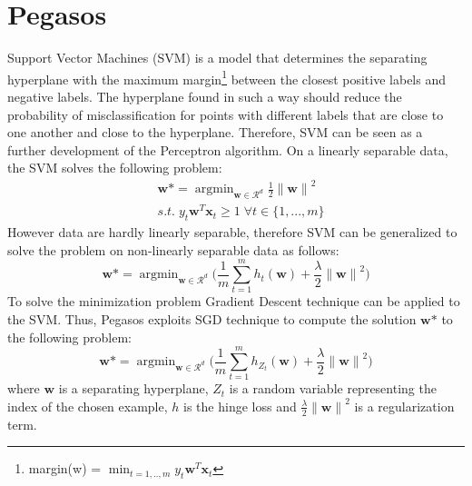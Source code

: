\documentclass{article}
\DeclareMathOperator*{\argmin}{argmin}
\begin{document}
\section{Pegasos} \label{Pegaos}
 Support Vector Machines (SVM) is a model that determines the separating hyperplane with the maximum margin\footnote{margin(w) = $\min_{t=1,..,m} y_t\textbf{w}^T\textbf{x}_t$} between the closest positive labels and negative labels. The hyperplane found in such a way should reduce the probability of misclassification for points with different labels that are close to one another and close to the hyperplane. Therefore, SVM can be seen as a further development of the Perceptron algorithm.
 On a linearly separable data, the SVM solves the following problem:
\begin{equation}
\begin{split}
   &   \textbf{w} \mbox{*} = \argmin_{\textbf{w} \in \mathcal{R}^d} \frac{1}{2} {\lVert \textbf{w} \rVert}^2 \\
   & s.t.\; y_t\textbf{w}^{T}\textbf{x}_t \geq 1 \; \forall t \in \{1, ...,m\} 
\end{split}
\end{equation}
However data are hardly linearly separable, therefore SVM can be generalized to solve the problem on non-linearly separable data as follows:
\begin{equation}
      \textbf{w} \mbox{*} = \argmin_{\textbf{w} \in \mathcal{R}^d} \bigg( \frac{1}{m}\sum_{t=1}^m h_t(\textbf{w}) + \frac{\lambda}{2} {\lVert \textbf{w} \rVert}^2 \bigg)
\end{equation}
To solve the minimization problem Gradient Descent technique can be applied to the SVM. Thus,
Pegasos exploits SGD technique to compute the solution $ \textbf{w} \mbox{*}$ to the following problem:
\begin{equation} 
    \textbf{w} \mbox{*} = \argmin_{\textbf{w} \in \mathcal{R}^d}\bigg( \frac{1}{m}\sum_{t=1}^m h_{Z_t}(\textbf{w}) + \frac{\lambda}{2} {\lVert \textbf{w}\rVert}^2  \bigg)
\end{equation}
where $\textbf{w}$ is a separating hyperplane,  $Z_t$ is a random variable representing the index of the chosen example, $h$ is the hinge loss and $\frac{\lambda}{2} {\lVert \textbf{w} \rVert}^2$ is a regularization term.
\end{document}
